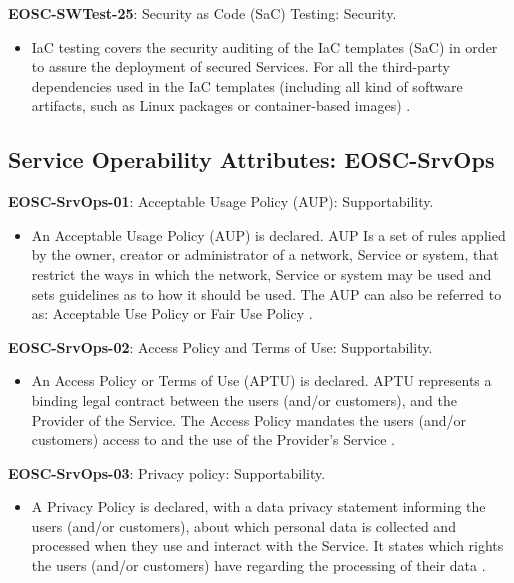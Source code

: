 \textbf{EOSC-SWTest-25}: Security as Code (SaC) Testing: Security.

\begin{itemize}
    \item IaC testing covers the security auditing of the IaC templates (SaC) in order to assure the deployment of secured Services. For all the third-party dependencies used in the IaC templates (including all kind of software artifacts, such as Linux packages or container-based images) \cite{orviz_fernandez_eosc-synergy_2020}.
\end{itemize}

\subsection{Service Operability Attributes: EOSC-SrvOps}

\textbf{EOSC-SrvOps-01}: Acceptable Usage Policy (AUP): Supportability.

\begin{itemize}
    \item An Acceptable Usage Policy (AUP) is declared. AUP Is a set of rules applied by the owner, creator or administrator of a network, Service or system, that restrict the ways in which the network, Service or system may be used and sets guidelines as to how it should be used. The AUP can also be referred to as: Acceptable Use Policy or Fair Use Policy \cite{orviz_fernandez_eosc-synergy_2020}.
\end{itemize}

\textbf{EOSC-SrvOps-02}: Access Policy and Terms of Use: Supportability.

\begin{itemize}
    \item An Access Policy or Terms of Use (APTU) is declared. APTU represents a binding legal contract between the users (and/or customers), and the Provider of the Service. The Access Policy mandates the users (and/or customers) access to and the use of the Provider's Service \cite{orviz_fernandez_eosc-synergy_2020}.
\end{itemize}

\textbf{EOSC-SrvOps-03}: Privacy policy: Supportability.

\begin{itemize}
    \item A Privacy Policy is declared, with a data privacy statement informing the users (and/or customers), about which personal data is collected and processed when they use and interact with the Service. It states which rights the users (and/or customers) have regarding the processing of their data \cite{orviz_fernandez_eosc-synergy_2020}.
\end{itemize}

